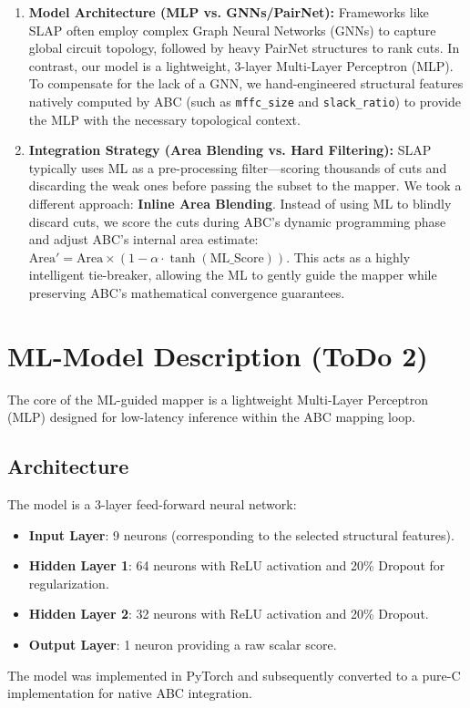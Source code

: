 \documentclass[11pt,a4paper]{article}
\begin{document}
\begin{enumerate}
    \item \textbf{Model Architecture (MLP vs. GNNs/PairNet):} Frameworks like SLAP often employ complex Graph Neural Networks (GNNs) to capture global circuit topology, followed by heavy PairNet structures to rank cuts. In contrast, our model is a lightweight, 3-layer Multi-Layer Perceptron (MLP). To compensate for the lack of a GNN, we hand-engineered structural features natively computed by ABC (such as \texttt{mffc\_size} and \texttt{slack\_ratio}) to provide the MLP with the necessary topological context.
    \item \textbf{Integration Strategy (Area Blending vs. Hard Filtering):} SLAP typically uses ML as a pre-processing filter—scoring thousands of cuts and discarding the weak ones before passing the subset to the mapper. We took a different approach: \textbf{Inline Area Blending}. Instead of using ML to blindly discard cuts, we score the cuts during ABC's dynamic programming phase and adjust ABC's internal area estimate: $\text{Area}' = \text{Area} \times (1 - \alpha \cdot \tanh(\text{ML\_Score}))$. This acts as a highly intelligent tie-breaker, allowing the ML to gently guide the mapper while preserving ABC's mathematical convergence guarantees.
\end{enumerate}

\section{ML-Model Description (ToDo 2)}

The core of the ML-guided mapper is a lightweight Multi-Layer Perceptron (MLP) designed for low-latency inference within the ABC mapping loop.

\subsection{Architecture}
The model is a 3-layer feed-forward neural network:
\begin{itemize}
    \item \textbf{Input Layer}: 9 neurons (corresponding to the selected structural features).
    \item \textbf{Hidden Layer 1}: 64 neurons with ReLU activation and 20\% Dropout for regularization.
    \item \textbf{Hidden Layer 2}: 32 neurons with ReLU activation and 20\% Dropout.
    \item \textbf{Output Layer}: 1 neuron providing a raw scalar score.
\end{itemize}
The model was implemented in PyTorch and subsequently converted to a pure-C implementation for native ABC integration.
\end{document}
